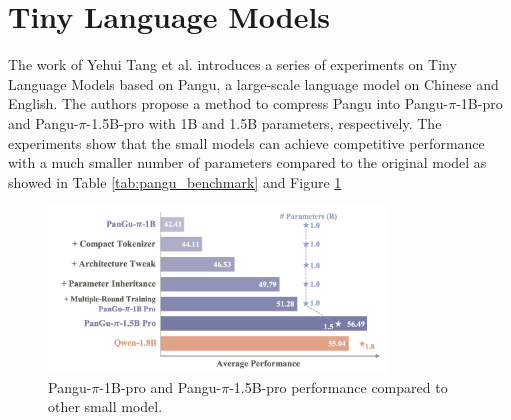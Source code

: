 \section{Tiny Language Models}
The work of Yehui Tang et al. \cite{tang2024rethinkingoptimizationarchitecturetiny} introduces a series of experiments on Tiny Language Models based on Pangu, a large-scale  language model on Chinese and English. The authors propose a method to compress Pangu into Pangu-$\pi$-1B-pro and Pangu-$\pi$-1.5B-pro with 1B and 1.5B parameters, respectively. The experiments show that the small models can achieve competitive performance with a much smaller number of parameters compared to the original model as showed in Table \ref{tab:pangu_benchmark} and Figure \ref{fig:pangu_pi} \par

\begin{figure}[!h]
    \centering
    \includegraphics[width=0.8\textwidth]{Figures/pangu.png}
    \caption{Pangu-$\pi$-1B-pro and Pangu-$\pi$-1.5B-pro performance compared to other small model.}
    \label{fig:pangu_pi}
\end{figure}

